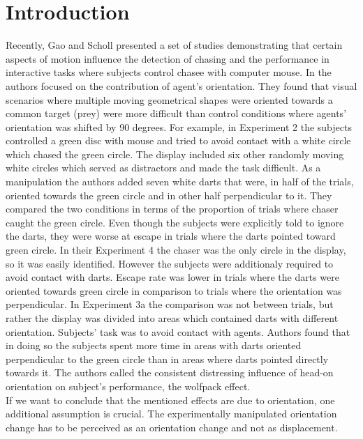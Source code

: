 \documentclass[10pt]{article}
\begin{document}
\section*{Introduction}
Recently, Gao and Scholl presented a set of studies \cite{gao09,gao10,gao11} demonstrating that certain aspects of motion influence the detection of chasing and the performance in interactive tasks where subjects control chasee with computer mouse. 
In \cite{gao10} the authors focused on the contribution of agent's orientation. 
They found that visual scenarios where multiple moving geometrical shapes were oriented towards a common target (prey) were more difficult than control conditions where agents' orientation was shifted by 90 degrees. 
For example, in Experiment 2 the subjects controlled a green disc with mouse and tried to avoid contact with a white circle which chased the green circle. 
The display included six other randomly moving white circles which served as distractors and made the task difficult. 
As a manipulation the authors added seven white darts that were, in half of the trials, oriented towards the green circle and in other half perpendicular to it. 
They compared the two conditions in terms of the proportion of trials where chaser caught the green circle. 
Even though the subjects were explicitly told to ignore the darts, they were worse at escape in trials where the darts pointed toward green circle. 
In their Experiment 4 the chaser was the only circle in the display, so it was easily identified. 
However the subjects were additionaly required to avoid contact with darts. 
Escape rate was lower in trials where the darts were oriented towards green circle in comparison to trials where the orientation was perpendicular. 
In Experiment 3a the comparison was not between trials, but rather the display was divided into areas which contained darts with different orientation. 
Subjects' task was to avoid contact with agents. 
Authors found that in doing so the subjects spent more time in areas with darts oriented perpendicular to the green circle than in areas where darts pointed directly towards it.
The authors called the consistent distressing influence of head-on orientation on subject's performance, the wolfpack effect.\\
If we want to conclude that the mentioned effects are due to orientation, one additional assumption is crucial. 
The experimentally manipulated orientation change has to be perceived as an orientation change and not as displacement. 
\end{document}
